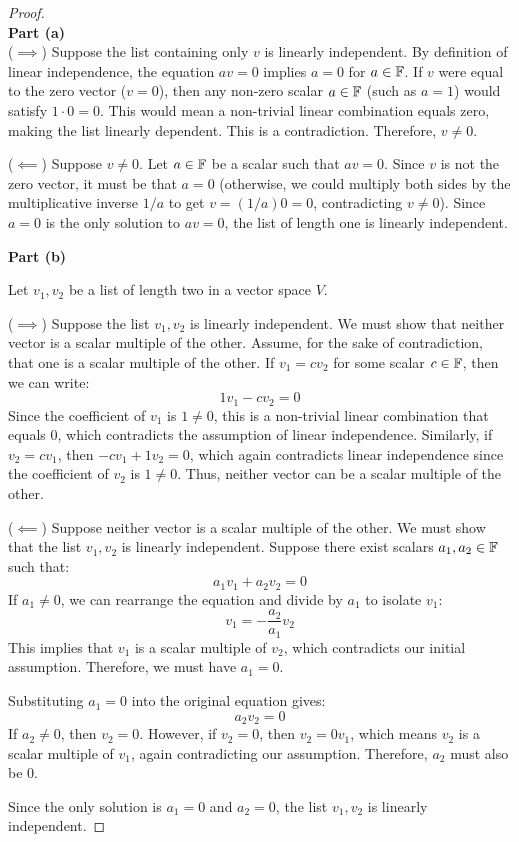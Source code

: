 \begin{proof} \mbox{}\\
	\textbf{Part (a)} \mbox{} \\
	($\implies$) Suppose the list containing only $v$ is linearly independent. By definition of linear independence, the equation $av = 0$ implies $a = 0$ for $a \in \mathbb{F}$. If $v$ were equal to the zero vector ($v = 0$), then any non-zero scalar $a \in \mathbb{F}$ (such as $a = 1$) would satisfy $1 \cdot 0 = 0$. This would mean a non-trivial linear combination equals zero, making the list linearly dependent. This is a contradiction. Therefore, $v \neq 0$.
	
	($\impliedby$) Suppose $v \neq 0$. Let $a \in \mathbb{F}$ be a scalar such that $av = 0$. Since $v$ is not the zero vector, it must be that $a = 0$ (otherwise, we could multiply both sides by the multiplicative inverse $1/a$ to get $v = (1/a)0 = 0$, contradicting $v \neq 0$). Since $a = 0$ is the only solution to $av = 0$, the list of length one is linearly independent.
	
	\vspace{1em}
	
	\textbf{Part (b)}
	
	Let $v_1, v_2$ be a list of length two in a vector space $V$. 
	
	($\implies$) Suppose the list $v_1, v_2$ is linearly independent. We must show that neither vector is a scalar multiple of the other. Assume, for the sake of contradiction, that one is a scalar multiple of the other. 
	If $v_1 = c v_2$ for some scalar $c \in \mathbb{F}$, then we can write:
	\[
	1 v_1 - c v_2 = 0
	\]
	Since the coefficient of $v_1$ is $1 \neq 0$, this is a non-trivial linear combination that equals $0$, which contradicts the assumption of linear independence. 
	Similarly, if $v_2 = c v_1$, then $-c v_1 + 1 v_2 = 0$, which again contradicts linear independence since the coefficient of $v_2$ is $1 \neq 0$. Thus, neither vector can be a scalar multiple of the other.
	
	($\impliedby$) Suppose neither vector is a scalar multiple of the other. We must show that the list $v_1, v_2$ is linearly independent. Suppose there exist scalars $a_1, a_2 \in \mathbb{F}$ such that:
	\[
	a_1 v_1 + a_2 v_2 = 0
	\]
	If $a_1 \neq 0$, we can rearrange the equation and divide by $a_1$ to isolate $v_1$:
	\[
	v_1 = -\frac{a_2}{a_1} v_2
	\]
	This implies that $v_1$ is a scalar multiple of $v_2$, which contradicts our initial assumption. Therefore, we must have $a_1 = 0$. 
	
	Substituting $a_1 = 0$ into the original equation gives:
	\[
	a_2 v_2 = 0
	\]
	If $a_2 \neq 0$, then $v_2 = 0$. However, if $v_2 = 0$, then $v_2 = 0 v_1$, which means $v_2$ is a scalar multiple of $v_1$, again contradicting our assumption. Therefore, $a_2$ must also be $0$. 
	
	Since the only solution is $a_1 = 0$ and $a_2 = 0$, the list $v_1, v_2$ is linearly independent.
\end{proof}

